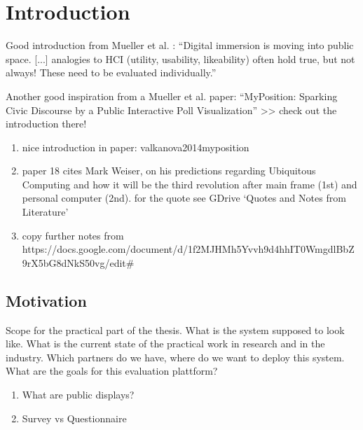 \section{Introduction}
\label{sec:introduction}




  Good introduction from Mueller et al. \cite{muller2010requirements}: ``Digital immersion is moving into public space. [...] analogies to HCI (utility, usability, likeability) often hold true, but not always! These need to be evaluated individually.''

  Another good inspiration from a Mueller et al. paper: ``MyPosition: Sparking Civic Discourse by a Public Interactive Poll Visualization'' >> check out the introduction there!



\begin{enumerate}
\item nice introduction in paper: valkanova2014myposition
\item paper 18 cites Mark Weiser, on his predictions regarding Ubiquitous Computing and how it will be the third revolution after main frame (1st) and personal computer (2nd). for the quote see GDrive `Quotes and Notes from Literature'
\item copy further notes from https://docs.google.com/document/d/1f2MJHMh5Yvvh9d4hhIT0WmgdlBbZ9rX5bG8dNkS50vg/edit#
\end{enumerate}



\subsection{Motivation}

Scope for the practical part of the thesis. What is the system supposed to look like. What is the current state of the practical work in research and in the industry. Which partners do we have, where do we want to deploy this system. What are the goals for this evaluation plattform?



  \begin{enumerate}
  \item What are public displays?
  \item Survey vs Questionnaire
  \end{enumerate}


